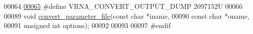 \begin{DoxyCode}
00064 
\mbox{\hyperlink{group__energy__parameters__convert_gac86976e9c2a55b3a6481ea60044f6098}{00065}} \textcolor{preprocessor}{#define VRNA\_CONVERT\_OUTPUT\_DUMP          2097152U}
00066 
00089 \textcolor{keywordtype}{void} \mbox{\hyperlink{group__energy__parameters__convert_gafbe538bc4eb2cf2a33326e1010005f8a}{convert\_parameter\_file}}(\textcolor{keyword}{const} \textcolor{keywordtype}{char}    *iname,
00090                             \textcolor{keyword}{const} \textcolor{keywordtype}{char}    *oname,
00091                             \textcolor{keywordtype}{unsigned} \textcolor{keywordtype}{int}  options);
00092 
00093 
00097 \textcolor{preprocessor}{#endif}
\end{DoxyCode}
